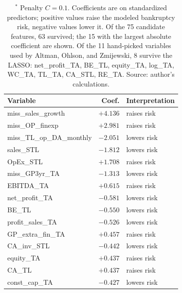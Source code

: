 \documentclass[12pt,a4paper]{article}
\begin{document}
\begin{table}[ht]
\centering
\caption{Top variables selected by the LASSO logit, H1.$^{*}$}
\label{tab:lasso-survivors}
\small
\begin{tabular}{lrl}
\toprule
Variable & Coef. & Interpretation \\
\midrule
miss\_sales\_growth        & $+4.136$ & raises risk \\
miss\_OP\_finexp           & $+2.981$ & raises risk \\
miss\_TL\_op\_DA\_monthly  & $-2.051$ & lowers risk \\
sales\_STL                 & $-1.812$ & lowers risk \\
OpEx\_STL                  & $+1.708$ & raises risk \\
miss\_GP3yr\_TA            & $-1.313$ & lowers risk \\
EBITDA\_TA                 & $+0.615$ & raises risk \\
net\_profit\_TA            & $-0.581$ & lowers risk \\
BE\_TL                     & $-0.550$ & lowers risk \\
profit\_sales\_TA          & $-0.526$ & lowers risk \\
GP\_extra\_fin\_TA         & $+0.457$ & raises risk \\
CA\_inv\_STL               & $-0.442$ & lowers risk \\
equity\_TA                 & $+0.437$ & raises risk \\
CA\_TL                     & $+0.437$ & raises risk \\
const\_cap\_TA             & $-0.427$ & lowers risk \\
\bottomrule
\end{tabular}
\caption*{\footnotesize $^{*}$ Penalty $C = 0.1$. Coefficients are on
standardized predictors; positive values raise the modeled bankruptcy risk,
negative values lower it. Of the 75 candidate features, 63 survived; the 15
with the largest absolute coefficient are shown. Of the 11 hand-picked
variables used by Altman, Ohlson, and Zmijewski, 8 survive the LASSO:
net\_profit\_TA, BE\_TL, equity\_TA, log\_TA, WC\_TA, TL\_TA, CA\_STL, RE\_TA.
Source: author's calculations.}
\end{table}
\end{document}
